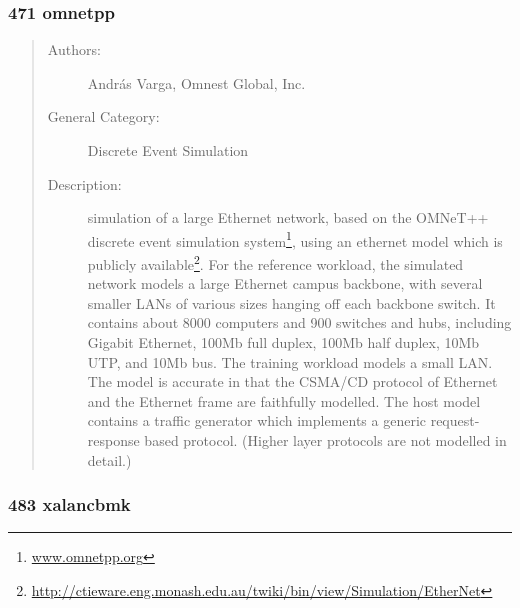 \documentclass[onecolumn, openright, master, english, signatures]{dbrgrptt}
\begin{document}
\subsubsection{471 omnetpp}

\begin{quote}
\begin{description}
\item[Authors:] Andr\'as Varga, Omnest Global, Inc.

\item[General Category:] Discrete Event Simulation

\item[Description:] simulation of a large Ethernet network, based on the OMNeT++ discrete event simulation system\footnote{\url{www.omnetpp.org}}, using an ethernet model which is publicly available\footnote{\url{http://ctieware.eng.monash.edu.au/twiki/bin/view/Simulation/EtherNet}}.
For the reference workload, the simulated network models a large Ethernet campus backbone, with several smaller LANs of various sizes hanging off each backbone switch. It contains about 8000 computers and 900 switches and hubs, including Gigabit Ethernet, 100Mb full duplex, 100Mb half duplex, 10Mb UTP, and 10Mb bus. The training workload models a small LAN.
The model is accurate in that the CSMA/CD protocol of Ethernet and the Ethernet frame are faithfully modelled. The host model contains a traffic generator which implements a generic request-response based protocol. (Higher layer protocols are not modelled in detail.)
\end{description}
\end{quote}

\subsubsection{483 xalancbmk}
\end{document}
